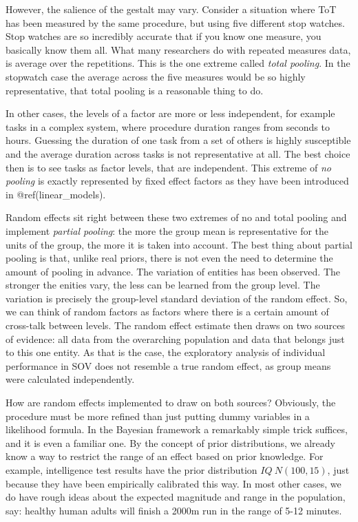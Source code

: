\documentclass[]{svmono}
\begin{document}
However, the salience of the gestalt may vary. Consider a situation
where ToT has been measured by the same procedure, but using five
different stop watches. Stop watches are so incredibly accurate that if
you know one measure, you basically know them all. What many researchers
do with repeated measures data, is average over the repetitions. This is
the one extreme called \emph{total pooling}. In the stopwatch case the
average across the five measures would be so highly representative, that
total pooling is a reasonable thing to do.

In other cases, the levels of a factor are more or less independent, for
example tasks in a complex system, where procedure duration ranges from
seconds to hours. Guessing the duration of one task from a set of others
is highly susceptible and the average duration across tasks is not
representative at all. The best choice then is to see tasks as factor
levels, that are independent. This extreme of \emph{no pooling} is
exactly represented by fixed effect factors as they have been introduced
in @ref(linear\_models).

Random effects sit right between these two extremes of no and total
pooling and implement \emph{partial pooling}: the more the group mean is
representative for the units of the group, the more it is taken into
account. The best thing about partial pooling is that, unlike real
priors, there is not even the need to determine the amount of pooling in
advance. The variation of entities has been observed. The stronger the
enities vary, the less can be learned from the group level. The
variation is precisely the group-level standard deviation of the random
effect. So, we can think of random factors as factors where there is a
certain amount of cross-talk between levels. The random effect estimate
then draws on two sources of evidence: all data from the overarching
population and data that belongs just to this one entity. As that is the
case, the exploratory analysis of individual performance in SOV does not
resemble a true random effect, as group means were calculated
independently.

How are random effects implemented to draw on both sources? Obviously,
the procedure must be more refined than just putting dummy variables in
a likelihood formula. In the Bayesian framework a remarkably simple
trick suffices, and it is even a familiar one. By the concept of prior
distributions, we already know a way to restrict the range of an effect
based on prior knowledge. For example, intelligence test results have
the prior distribution \(IQ ~ N(100, 15)\), just because they have been
empirically calibrated this way. In most other cases, we do have rough
ideas about the expected magnitude and range in the population, say:
healthy human adults will finish a 2000m run in the range of 5-12
minutes.
\end{document}
